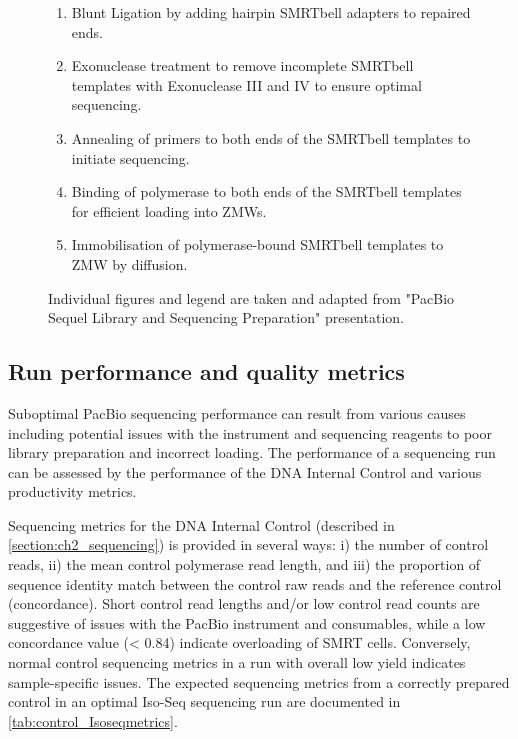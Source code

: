 \begin{figure}[!htp]
{\begin{enumerate}
			\item Blunt Ligation by adding hairpin SMRTbell adapters to repaired ends.
			\item Exonuclease treatment to remove incomplete SMRTbell templates with Exonuclease III and IV to ensure optimal sequencing.
			\item Annealing of primers to both ends of the SMRTbell templates to initiate sequencing. 
			\item Binding of polymerase to both ends of the SMRTbell templates for efficient loading into ZMWs.
			\item Immobilisation of polymerase-bound SMRTbell templates to ZMW by diffusion.
			\\
		\end{enumerate} 
		Individual figures and legend are taken and adapted from "PacBio Sequel Library and Sequencing Preparation" presentation.
	}
	\label{fig:isoseq_labworkflow}
\end{figure}

\clearpage
\subsection{Run performance and quality metrics}
\label{sec: Isoseq_run_performance}
Suboptimal PacBio sequencing performance can result from various causes including potential issues with the instrument and sequencing reagents to poor library preparation and incorrect loading. The performance of a sequencing run can be assessed by the performance of the DNA Internal Control and various productivity metrics. 

Sequencing metrics for the DNA Internal Control (described in \cref{section:ch2_sequencing}) is provided in several ways: i) the number of control reads, ii) the mean control polymerase read length, and iii) the proportion of sequence identity match between the control raw reads and the reference control (concordance). Short control read lengths and/or low control read counts are suggestive of issues with the PacBio instrument and consumables, while a low concordance value (< 0.84) indicate overloading of SMRT cells. Conversely, normal control sequencing metrics in a run with overall low yield indicates sample-specific issues. The expected sequencing metrics from a correctly prepared control in an optimal Iso-Seq sequencing run are documented in \cref{tab:control_Isoseqmetrics}. 

